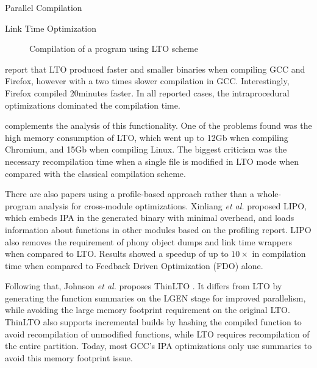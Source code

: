 \begin{section}{Parallel Compilation}
\begin{subsection}{Link Time Optimization}
\begin{figure}
{{
}
}%
\caption{Compilation of a program using LTO scheme}
\label{fig:whopr_build}
\end{figure}

\cite{glek2010optimizing} report that LTO produced faster and smaller binaries when compiling GCC
and Firefox, however with a two times slower compilation in GCC. Interestingly,
Firefox compiled 20minutes faster. In all reported cases, the intraprocedural
optimizations dominated the compilation time.

\cite{livska2014optimizing} complements the analysis of this functionality. One
of the problems found was the high memory consumption of LTO, which went up to
12Gb when compiling Chromium, and 15Gb when compiling Linux. The biggest
criticism was the necessary recompilation time when a single file is modified
in LTO mode when compared with the classical compilation scheme.

There are also papers using a profile-based approach rather than a whole-program
analysis for cross-module optimizations.  Xinliang \textit{et al.}
\cite{lipo} proposed LIPO, which embeds IPA in the generated
binary with minimal overhead, and loads information about functions in other
modules based on the profiling report. LIPO also removes the requirement of
phony object dumps and link time wrappers when compared to LTO. Results showed
a speedup of up to $10\times$ in compilation time when compared to Feedback
Driven Optimization (FDO) alone.

Following that, Johnson \textit{et al.} proposes ThinLTO \cite{thinlto}. It
differs from LTO by generating the function summaries on the LGEN stage for
improved parallelism, while avoiding the large memory footprint requirement on the
original LTO. ThinLTO also supports incremental builds by hashing the compiled
function to avoid recompilation of unmodified functions, while LTO requires
recompilation of the entire partition. Today, most GCC's IPA
optimizations only use summaries to avoid this memory footprint issue.

\end{subsection}
\end{section}

